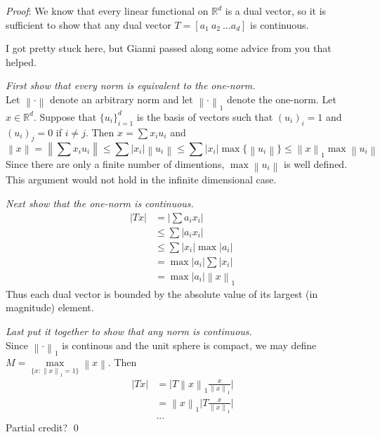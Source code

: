 \documentclass[12pt]{article}
\newcommand{\norm}[1]{\left\lVert#1\right\rVert}
\renewenvironment{proof}{\hspace{-4 ex} \emph{Proof}:}{\qed}
\newcommand{\RR}{\mathbb{R}}
\begin{document}
	\begin{proof}
		We know that every linear functional on $\RR^d$ is a dual vector, so it is sufficient to show that any dual vector $T=[a_1\ a_2\ \dots a_d]$ is continuous. \bigbreak
		
		I got pretty stuck here, but Gianni passed along some advice from you that helped. \bigbreak
		
		\textit{First show that every norm is equivalent to the one-norm.} \\		
		Let $\norm{\cdot}$ denote an arbitrary norm and let $\norm{\cdot}_1$ denote the one-norm. Let $x \in \RR^d$. Suppose that $\{u_i\}_{i=1}^d$ is the basis of vectors such that $(u_i)_i = 1$ and $(u_i)_j = 0$ if $i \neq j$. Then $x = \sum x_i u_i$ and
		$$
		\norm{x} = \norm{\sum x_i u_i} \leq \sum \vert x_i \vert \norm{u_i} \leq \sum \vert x_i \vert \max\{\norm{u_i}\} \leq \norm{x}_1 \max \norm{u_i}
		$$
		Since there are only a finite number of dimentions, $\max \norm{u_i}$ is well defined. This argument would not hold in the infinite dimensional case.

		\bigbreak
		\textit{Next show that the one-norm is continuous.}\\
		\begin{align*}
			\vert Tx \vert & = \Big \vert \sum a_i x_i \Big \vert \\
			& \leq \sum \vert a_i x_i \vert \\
			& \leq \sum \vert x_i \vert \max \vert a_i \vert \\
			& = \max \vert a_i \vert \sum \vert x_i \vert \\
			& = \max \vert a_i \vert \norm{x}_1
		\end{align*}
		Thus each dual vector is bounded by the absolute value of its largest (in magnitude) element.
		
		\bigbreak
		\textit{Last put it together to show that any norm is continuous.} \\
		Since $\norm{\cdot}_1$ is continous and the unit sphere is compact, we may define\\ $M = \max\limits_{ \{x: \norm{x}_1 = 1 \} } \norm{x}$. Then
		\begin{align*}
			\vert Tx \vert & = \vert T \norm{x}_1\frac{x}{\norm{x}_1} \vert \\
				& = \norm{x}_1 \vert T\frac{x}{\norm{x}_1} \vert \\
				& ...
		\end{align*}
		Partial credit?
	\end{proof}
\end{document}
